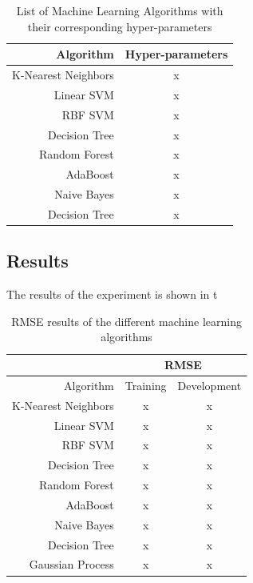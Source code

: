 \documentclass{article}
\begin{document}
 \begin{table}
  \begin{center}
   \begin{tabular}{ | r | c |}
    \hline
     Algorithm & Hyper-parameters \\ \hline\hline
    K-Nearest Neighbors        & x \\ \hline
    Linear SVM                 & x \\ \hline
    RBF SVM                    & x \\ \hline
    Decision Tree              & x \\ \hline
    Random Forest              & x \\ \hline
    AdaBoost                   & x \\ \hline
    Naive Bayes                & x \\ \hline
    Decision Tree              & x \\ \hline
   \end{tabular}
  \end{center}
  \caption{List of Machine Learning Algorithms with their corresponding hyper-parameters}
  \label{list_mls}
 \end{table}
 \subsection{Results}
 The results of the experiment is shown in t
 
 \begin{table}
  \begin{center}
   \begin{tabular}{ | r | c | c |}
    \hline
    & \multicolumn{2}{c|}{RMSE} \\ \hline
     Algorithm & Training & Development \\ \hline\hline
    K-Nearest Neighbors        & x & x \\ \hline
    Linear SVM                 & x & x \\ \hline
    RBF SVM                    & x & x \\ \hline
    Decision Tree              & x & x \\ \hline
    Random Forest              & x & x \\ \hline
    AdaBoost                   & x & x \\ \hline
    Naive Bayes                & x & x \\ \hline
    Decision Tree              & x & x \\ \hline
    Gaussian Process           & x & x \\ \hline
   \end{tabular}
  \end{center}
  \caption{RMSE results of the different machine learning algorithms}
  \label{rmse_results}
 \end{table}
 
\end{document}
